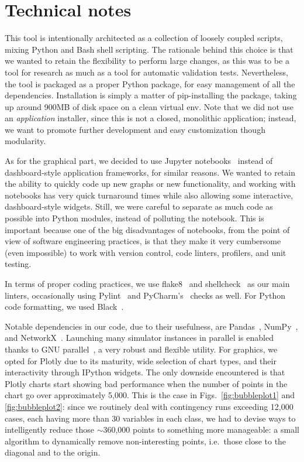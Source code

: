 \documentclass[conference]{IEEEtran}
\begin{document}
\section{Technical notes}

This tool is intentionally architected as a collection of loosely
coupled scripts, mixing Python and Bash shell scripting. The rationale
behind this choice is that we wanted to retain the flexibility to
perform large changes, as this was to be a tool for research as much
as a tool for automatic validation tests. Nevertheless, the tool is
packaged as a proper Python package, for easy management of all the
dependencies. Installation is simply a matter of pip-installing the
package, taking up around 900MB of disk space on a clean virtual env.
Note that we did not use an \emph{application} installer, since this
is not a closed, monolithic application; instead, we want to promote
further development and easy customization though modularity.

As for the graphical part, we decided to use Jupyter
notebooks~\cite{jupyter_nb} instead of dashboard-style application
frameworks, for similar reasons. We wanted to retain the ability to
quickly code up new graphs or new functionality, and working with
notebooks has very quick turnaround times while also allowing some
interactive, dashboard-style widgets.  Still, we were careful to
separate as much code as possible into Python modules, instead of
polluting the notebook. This is important because one of the big
disadvantages of notebooks, from the point of view of software
engineering practices, is that they make it very cumbersome (even
impossible) to work with version control, code linters, profilers, and
unit testing.

In terms of proper coding practices, we use flake8~\cite{flake8} and
shellcheck~\cite{shellcheck} as our main linters, occasionally using
  Pylint~\cite{pylint} and PyCharm's~\cite{pycharm} checks as
  well. For Python code formatting, we used Black~\cite{black}.

Notable dependencies in our code, due to their usefulness, are
Pandas~\cite{pandas}, NumPy~\cite{numpy}, and
NetworkX~\cite{networkX}.  Launching many simulator instances in
parallel is enabled thanks to GNU parallel~\cite{GNUparallel}, a very
robust and flexible utility. For graphics, we opted for Plotly due to
its maturity, wide selection of chart types, and their interactivity
through IPython widgets.  The only downside encountered is that Plotly
charts start showing bad performance when the number of points in the
chart go over approximately 5,000.  This is the case in
Figs.~\ref{fig:bubbleplot1} and \ref{fig:bubbleplot2}: since we
routinely deal with contingency runs exceeding 12,000 cases, each
having more than 30 variables in each class, we had to devise ways to
intelligently reduce those $\sim$360,000 points to something more
manageable: a small algorithm to dynamically remove non-interesting
points, i.e.~those close to the diagonal and to the origin.
\end{document}
